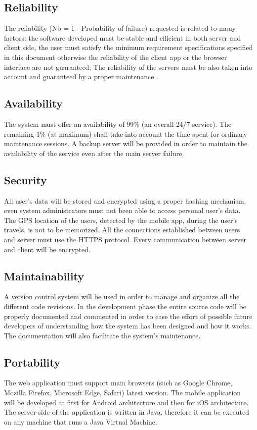 \subsection{Reliability}
\label{subsect:Reliability}
	The reliability (Nb = 1 - Probability of failure) requested is related to many factors: the software developed must be stable and efficient in both server and client side, the user must satisfy the minimum requirement specifications specified in this document otherwise the reliability of the client app or the browser interface are not guaranteed; The reliability of the servers must be also taken into account and guaranteed by a proper maintenance .

\subsection{Availability}
\label{subsect:Availability}
	The system must offer an availability of 99\% (an overall 24/7 service). The remaining 1\% (at maximum) shall take into account the time spent for ordinary maintenance sessions. A backup server will be provided in order to maintain the availability of the service even after the main server failure.
\subsection{Security}
\label{subsect:Security}
	All user's data will be stored and encrypted using a proper hashing mechanism, even system administrators must not been able to access personal user's data. The GPS location of the users, detected by the mobile app, during the user's travels, is not to be memorized. All the connections established between users and server must use the
HTTPS protocol. Every communication between server and client will be encrypted.
\subsection{Maintainability}
\label{subsect:Maintainability}
	A version control system will be used in order to manage and organize all the different code revisions. In the development phase the entire source code will be properly documented and commented in order to ease the effort of possible future developers of understanding how the system has been designed and how it works. The documentation will also facilitate the system's maintenance. 
\subsection{Portability}
\label{subsect:Portability}
	The web application must support main browsers (such as Google Chrome, Mozilla Firefox, Microsoft Edge, Safari) latest version.\newline 
	The mobile application will be developed at first for Android architecture and then for iOS architecture.\newline
	The server-side of the application is written in Java, therefore it can be executed on any machine that runs a Java Virtual Machine.